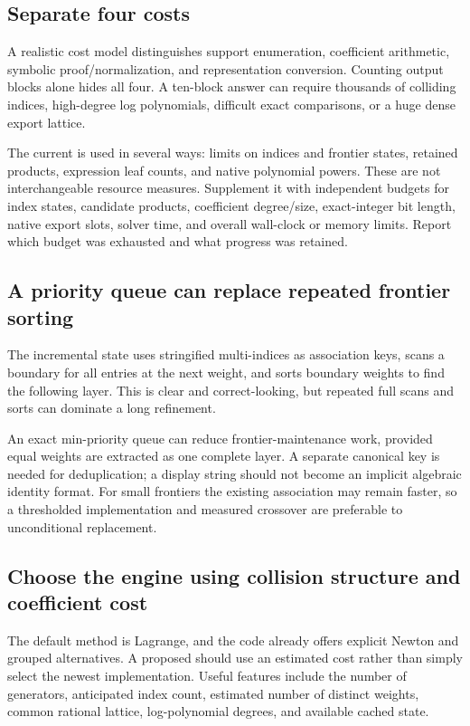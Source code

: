 \documentclass[11pt,a4paper]{article}
\newcommand{\code}[1]{\texttt{\detokenize{#1}}}
\begin{document}
\subsection{Separate four costs}
A realistic cost model distinguishes support enumeration, coefficient arithmetic, symbolic proof/normalization, and representation conversion. Counting output blocks alone hides all four. A ten-block answer can require thousands of colliding indices, high-degree log polynomials, difficult exact comparisons, or a huge dense export lattice.

The current \code{"MaxTerms"} is used in several ways: limits on indices and frontier states, retained products, expression leaf counts, and native polynomial powers. These are not interchangeable resource measures. Supplement it with independent budgets for index states, candidate products, coefficient degree/size, exact-integer bit length, native export slots, solver time, and overall wall-clock or memory limits. Report which budget was exhausted and what progress was retained.\cite{main,incremental,native,arithmetic,gamma}

\subsection{A priority queue can replace repeated frontier sorting}
The incremental state uses stringified multi-indices as association keys, scans a boundary for all entries at the next weight, and sorts boundary weights to find the following layer. This is clear and correct-looking, but repeated full scans and sorts can dominate a long refinement.\cite{incremental}

An exact min-priority queue can reduce frontier-maintenance work, provided equal weights are extracted as one complete layer. A separate canonical key is needed for deduplication; a display string should not become an implicit algebraic identity format. For small frontiers the existing association may remain faster, so a thresholded implementation and measured crossover are preferable to unconditional replacement.

\subsection{Choose the engine using collision structure and coefficient cost}
The default method is Lagrange, and the code already offers explicit Newton and grouped alternatives. A proposed \code{Method -> Automatic} should use an estimated cost rather than simply select the newest implementation. Useful features include the number of generators, anticipated index count, estimated number of distinct weights, common rational lattice, log-polynomial degrees, and available cached state.
\end{document}
